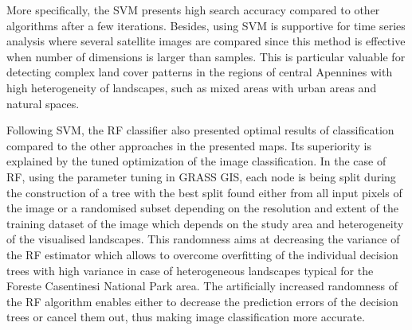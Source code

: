 \documentclass{elektr}
\begin{document}
More specifically, the SVM presents high search accuracy compared to other algorithms after a few iterations. Besides, using SVM is supportive for time series analysis where several satellite images are compared since this method is effective when number of dimensions is larger than samples. This is particular valuable for detecting complex land cover patterns in the regions of central Apennines with high heterogeneity of landscapes, such as mixed areas with urban areas and natural spaces. 

Following SVM, the RF classifier also presented optimal results of classification compared to the other approaches in the presented maps. Its superiority is explained by the tuned optimization of the image classification. In the case of RF, using the parameter tuning in GRASS GIS, each node is being split during the construction of a tree with the best split found either from all input pixels of the image or a randomised subset depending on the resolution and extent of the training dataset of the image which depends on the study area and heterogeneity of the visualised landscapes. This randomness aims at decreasing the variance of the RF estimator which allows to overcome overfitting of the individual decision trees with high variance in case of heterogeneous landscapes typical for the Foreste Casentinesi National Park area. The artificially increased randomness of the RF algorithm enables either to decrease the prediction errors of the decision trees or cancel them out, thus making image classification more accurate. 
\end{document}
